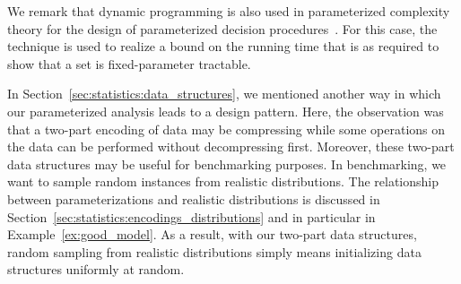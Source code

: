 We remark that dynamic programming is also used in parameterized complexity theory for the design of parameterized decision procedures~\parencite[see][Chapter~9]{niedermeier2006invitation}.
For this case, the technique is used to realize a bound on the running time that is as required to show that a set is fixed-parameter tractable.

In Section~\ref{sec:statistics:data_structures}, we mentioned another way in which our parameterized analysis leads to a design pattern.
Here, the observation was that a two-part encoding of data may be compressing while some operations on the data can be performed without decompressing first.
Moreover, these two-part data structures may be useful for benchmarking purposes.
In benchmarking, we want to sample random instances from realistic distributions.
The relationship between parameterizations and realistic distributions is discussed in Section~\ref{sec:statistics:encodings_distributions} and in particular in Example~\ref{ex:good_model}.
As a result, with our two-part data structures, random sampling from realistic distributions simply means initializing data structures uniformly at random.

